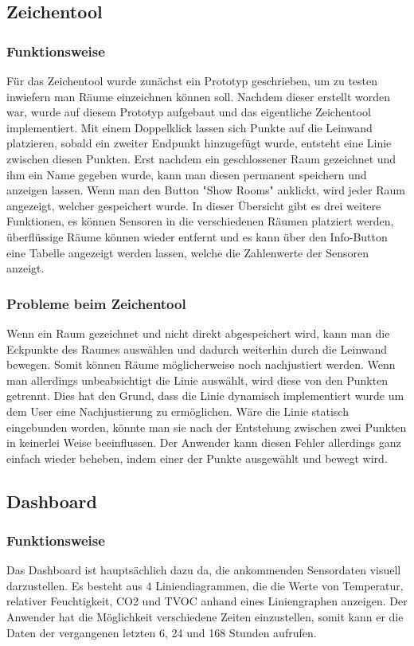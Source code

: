 \documentclass[]{article}
\begin{document}
			\subsection{Zeichentool}
				\subsubsection{Funktionsweise}
				Für das Zeichentool wurde zunächst ein Prototyp geschrieben, um zu testen inwiefern man Räume einzeichnen können soll. Nachdem dieser erstellt worden war, wurde auf diesem Prototyp aufgebaut und das eigentliche Zeichentool implementiert. Mit einem Doppelklick lassen sich Punkte auf die Leinwand platzieren, sobald ein zweiter Endpunkt hinzugefügt wurde, entsteht eine Linie zwischen diesen Punkten. Erst nachdem ein geschlossener Raum gezeichnet und ihm ein Name gegeben wurde, kann man diesen permanent speichern und anzeigen lassen. Wenn man den Button "Show Rooms" anklickt, wird jeder Raum angezeigt, welcher gespeichert wurde. In dieser Übersicht gibt es drei weitere Funktionen, es können Sensoren in die verschiedenen Räumen platziert werden, überflüssige Räume können wieder entfernt und es kann über den Info-Button eine Tabelle angezeigt werden lassen, welche die Zahlenwerte der Sensoren anzeigt. 
				\subsubsection{Probleme beim Zeichentool}
		 		Wenn ein Raum gezeichnet und nicht direkt abgespeichert wird, kann man die Eckpunkte des Raumes auswählen und dadurch weiterhin durch die Leinwand bewegen. Somit können Räume möglicherweise noch nachjustiert werden. Wenn man allerdings unbeabsichtigt die Linie auswählt, wird diese von den Punkten getrennt. Dies hat den Grund, dass die Linie dynamisch implementiert wurde um dem User eine Nachjustierung zu ermöglichen. Wäre die Linie statisch eingebunden worden, könnte man sie nach der Entstehung zwischen zwei Punkten in keinerlei Weise beeinflussen. Der Anwender kann diesen Fehler allerdings ganz einfach wieder beheben, indem einer der Punkte ausgewählt und bewegt wird.
			
			\subsection{Dashboard}
			\subsubsection{Funktionsweise}
			Das Dashboard ist hauptsächlich dazu da, die ankommenden Sensordaten visuell darzustellen. Es besteht aus 4 Liniendiagrammen, die die Werte von Temperatur, relativer Feuchtigkeit, CO2 und TVOC anhand eines Liniengraphen anzeigen. Der Anwender hat die Möglichkeit verschiedene Zeiten einzustellen, somit kann er die Daten der vergangenen letzten 6, 24 und 168 Stunden aufrufen. 
\end{document}
